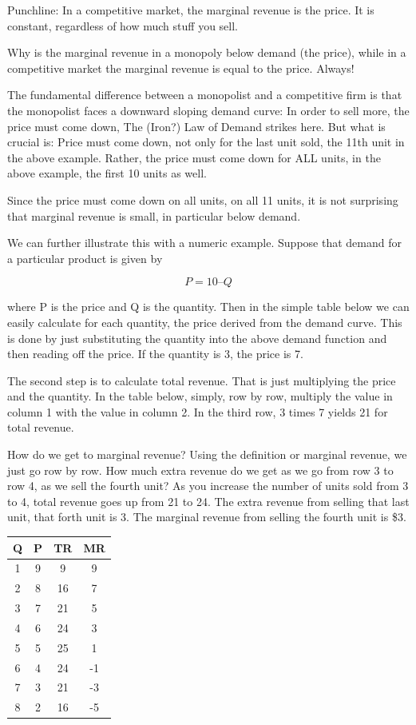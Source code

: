 \documentclass[
]{book}
\begin{document}
Punchline: In a competitive market, the marginal revenue is the price. It is constant, regardless of how much stuff you sell.

Why is the marginal revenue in a monopoly below demand (the price), while in a competitive market the marginal revenue is equal to the price. Always!

The fundamental difference between a monopolist and a competitive firm is that the monopolist faces a downward sloping demand curve: In order to sell more, the price must come down, The (Iron?) Law of Demand strikes here. But what is crucial is: Price must come down, not only for the last unit sold, the 11th unit in the above example. Rather, the price must come down for ALL units, in the above example, the first 10 units as well.

Since the price must come down on all units, on all 11 units, it is not surprising that marginal revenue is small, in particular below demand.

We can further illustrate this with a numeric example. Suppose that demand for a particular product is given by

\[P =  10 – Q\]

where P is the price and Q is the quantity. Then in the simple table below we can easily calculate for each quantity, the price derived from the demand curve. This is done by just substituting the quantity into the above demand function and then reading off the price. If the quantity is 3, the price is 7.

The second step is to calculate total revenue. That is just multiplying the price and the quantity. In the table below, simply, row by row, multiply the value in column 1 with the value in column 2. In the third row, 3 times 7 yields 21 for total revenue.

How do we get to marginal revenue? Using the definition or marginal revenue, we just go row by row. How much extra revenue do we get as we go from row 3 to row 4, as we sell the fourth unit? As you increase the number of units sold from 3 to 4, total revenue goes up from 21 to 24. The extra revenue from selling that last unit, that forth unit is 3. The marginal revenue from selling the fourth unit is \$3.

\begin{longtable}[]{@{}cccc@{}}
\toprule
Q & P & TR & MR \\
\midrule
\endhead
1 & 9 & 9 & 9 \\
2 & 8 & 16 & 7 \\
3 & 7 & 21 & 5 \\
4 & 6 & 24 & 3 \\
5 & 5 & 25 & 1 \\
6 & 4 & 24 & -1 \\
7 & 3 & 21 & -3 \\
8 & 2 & 16 & -5 \\
\bottomrule
\end{longtable}
\end{document}
